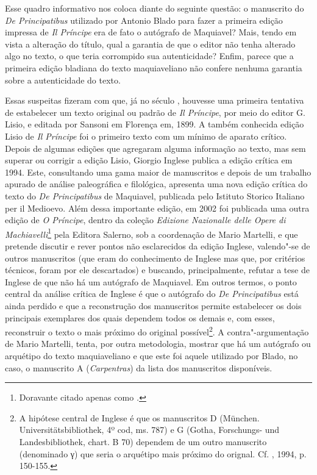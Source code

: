 Esse quadro informativo nos coloca diante do seguinte questão: o
manuscrito do \emph{De Principatibus} utilizado por Antonio Blado para
fazer a primeira edição impressa de \emph{Il Príncipe} era de fato o
autógrafo de Maquiavel? Mais, tendo em vista a alteração do título, qual
a garantia de que o editor não tenha alterado algo no texto, o que teria
corrompido sua autenticidade? Enfim, parece que a primeira edição
bladiana do texto maquiaveliano não confere nenhuma garantia sobre a
autenticidade do texto.

Essas suspeitas fizeram com que, já no século , houvesse uma primeira
tentativa de estabelecer um texto original ou padrão de \emph{Il
Príncipe}, por meio do editor G. Lisio, e editada por Sansoni em
Florença em, 1899. A também conhecida edição Lisio de \emph{Il Príncipe}
foi o primeiro texto com um mínimo de aparato crítico. Depois de algumas
edições que agregaram alguma informação ao texto, mas sem superar ou
corrigir a edição Lisio, Giorgio Inglese publica a edição crítica em
1994. Este, consultando uma gama maior de manuscritos e depois de um
trabalho apurado de análise paleográfica e filológica, apresenta uma
nova edição crítica do texto do \emph{De Principatibus} de Maquiavel,
publicada pelo Istituto Storico Italiano per il Medioevo. Além dessa
importante edição, em 2002 foi publicada uma outra edição de \emph{O
Príncipe}, dentro da coleção \emph{Edizione Nazionalle delle Opere di
Machiavelli}\footnote{Doravante citado apenas como \emph{.}} pela
Editora Salerno, sob a coordenação de Mario Martelli, e que pretende
discutir e rever pontos não esclarecidos da edição Inglese, valendo"-se
de outros manuscritos (que eram do conhecimento de Inglese mas que, por
critérios técnicos, foram por ele descartados) e buscando,
principalmente, refutar a tese de Inglese de que não há um autógrafo de
Maquiavel. Em outros termos, o ponto central da análise crítica de
Inglese é que o autógrafo do \emph{De Principatibus} está ainda perdido
e que a reconstrução dos manuscritos permite estabelecer os dois
principais exemplares dos quais dependem todos os demais e, com esses,
reconstruir o texto o mais próximo do original possível\footnote{A
  hipótese central de Inglese é que os manuscritos D (München.
  Universitätsbibliothek, 4º cod, ms. 787) e G (Gotha, Forschungs- und  %
  Landesbibliothek, chart. B 70) dependem de um outro manuscrito
  (denominado γ) que seria o arquétipo mais próximo do orignal. Cf.
  , 1994, p. 150-155.}. A contra"-argumentação de Mario Martelli,
tenta, por outra metodologia, mostrar que há um autógrafo ou arquétipo
do texto maquiaveliano e que este foi aquele utilizado por Blado, no
caso, o manuscrito A (\emph{Carpentras}) da lista dos manuscritos
disponíveis.

